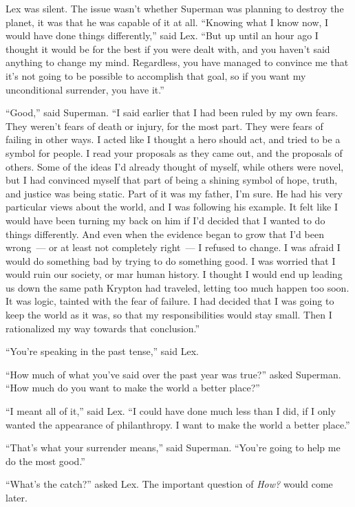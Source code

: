 Lex was silent. The issue wasn't whether Superman was planning to
destroy the planet, it was that he was capable of it at all. ``Knowing
what I know now, I would have done things differently,'' said Lex. ``But
up until an hour ago I thought it would be for the best if you were
dealt with, and you haven't said anything to change my mind. Regardless,
you have managed to convince me that it's not going to be possible to
accomplish that goal, so if you want my unconditional surrender, you
have it.''

``Good,'' said Superman. ``I said earlier that I had been ruled by my
own fears. They weren't fears of death or injury, for the most part.
They were fears of failing in other ways. I acted like I thought a hero
should act, and tried to be a symbol for people. I read your proposals
as they came out, and the proposals of others. Some of the ideas I'd
already thought of myself, while others were novel, but I had convinced
myself that part of being a shining symbol of hope, truth, and justice
was being static. Part of it was my father, I'm sure. He had his very
particular views about the world, and I was following his example. It
felt like I would have been turning my back on him if I'd decided that I
wanted to do things differently. And even when the evidence began to
grow that I'd been wrong~--- or at least not completely right~--- I
refused to change. I was afraid I would do something bad by trying to do
something good. I was worried that I would ruin our society, or mar
human history. I thought I would end up leading us down the same path
Krypton had traveled, letting too much happen too soon. It was logic,
tainted with the fear of failure. I had decided that I was going to keep
the world as it was, so that my responsibilities would stay small. Then
I rationalized my way towards that conclusion.''

``You're speaking in the past tense,'' said Lex.

``How much of what you've said over the past year was true?'' asked
Superman. ``How much do you want to make the world a better place?''

``I meant all of it,'' said Lex. ``I could have done much less than I
did, if I only wanted the appearance of philanthropy. I want to make the
world a better place.''

``That's what your surrender means,'' said Superman. ``You're going to
help me do the most good.''

``What's the catch?'' asked Lex. The important question of \emph{How?}
would come later.


